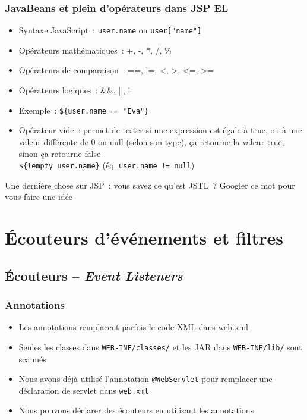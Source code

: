 \documentclass{beamer}
\begin{document}
\begin{frame}
	\frametitle{JavaBeans et plein d'opérateurs dans JSP EL}
	\begin{itemize}
		\item Syntaxe JavaScript~: \texttt{user.name} ou \texttt{user["name"]}
		\item Opérateurs mathématiques~: +, -, *, /, \%
		\item Opérateurs de comparaison~: ==, !=, <, >, <=, >=
		\item Opérateurs logiques~: \&\&, ||, !
		\item Exemple~: \texttt{\$\{user.name == "Eva"\}}
		\item Opérateur vide~: permet de tester si une expression est égale à true, ou à une valeur différente de 0 ou null (selon son type), ça retourne la valeur true, sinon ça retourne false\\ 
		\texttt{\$\{!empty user.name\}} (éq. \texttt{user.name != null})
		
	\end{itemize}
	Une dernière chose sur JSP~: vous savez ce qu'est JSTL~? Googler ce mot pour vous faire une idée
\end{frame}

\section{Écouteurs d'événements et filtres}

\subsection{Écouteurs -- \textit{Event Listeners}}
\begin{frame}
	\frametitle{Annotations}
	\begin{itemize}
		\item Les annotations remplacent parfois le code XML dans web.xml
		\item Seules les classes dans \texttt{WEB-INF/classes/} et les JAR dans \texttt{WEB-INF/lib/} sont scannés
		\item Nous avons déjà utilisé l'annotation \texttt{@WebServlet} pour remplacer une déclaration de servlet dans \texttt{web.xml}
		\item Nous pouvons déclarer des écouteurs en utilisant les annotations
	\end{itemize}
\end{frame}
\end{document}
